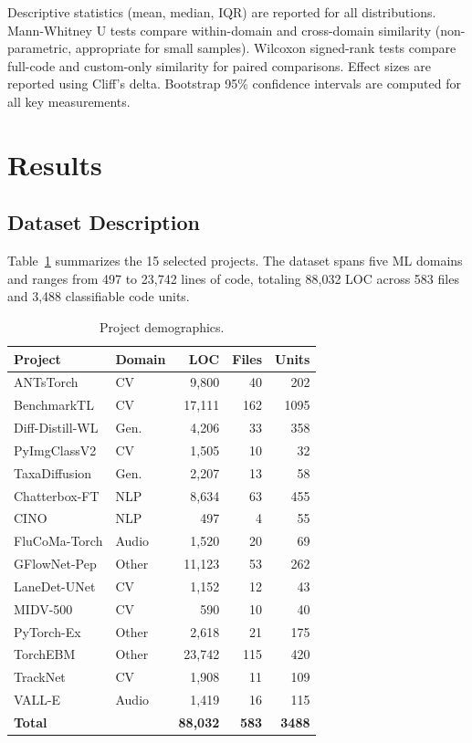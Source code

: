 \documentclass[smallextended,natbib]{svjour3}
\begin{document}
Descriptive statistics (mean, median, IQR) are reported for all distributions. Mann-Whitney U tests compare within-domain and cross-domain similarity (non-parametric, appropriate for small samples). Wilcoxon signed-rank tests compare full-code and custom-only similarity for paired comparisons. Effect sizes are reported using Cliff's delta. Bootstrap 95\% confidence intervals are computed for all key measurements.


\section{Results}
\label{sec:results}

\subsection{Dataset Description}

Table~\ref{tab:demographics} summarizes the 15 selected projects. The dataset spans five ML domains and ranges from 497 to 23,742 lines of code, totaling 88,032 LOC across 583 files and 3,488 classifiable code units.

\begin{table}[t]
\centering
\caption{Project demographics.}
\label{tab:demographics}
\small
\begin{tabular}{llrrr}
\toprule
Project & Domain & LOC & Files & Units \\
\midrule
ANTsTorch & CV & 9,800 & 40 & 202 \\
BenchmarkTL & CV & 17,111 & 162 & 1095 \\
Diff-Distill-WL & Gen. & 4,206 & 33 & 358 \\
PyImgClassV2 & CV & 1,505 & 10 & 32 \\
TaxaDiffusion & Gen. & 2,207 & 13 & 58 \\
Chatterbox-FT & NLP & 8,634 & 63 & 455 \\
CINO & NLP & 497 & 4 & 55 \\
FluCoMa-Torch & Audio & 1,520 & 20 & 69 \\
GFlowNet-Pep & Other & 11,123 & 53 & 262 \\
LaneDet-UNet & CV & 1,152 & 12 & 43 \\
MIDV-500 & CV & 590 & 10 & 40 \\
PyTorch-Ex & Other & 2,618 & 21 & 175 \\
TorchEBM & Other & 23,742 & 115 & 420 \\
TrackNet & CV & 1,908 & 11 & 109 \\
VALL-E & Audio & 1,419 & 16 & 115 \\
\midrule
\textbf{Total} & & \textbf{88,032} & \textbf{583} & \textbf{3488} \\
\bottomrule
\end{tabular}
\end{table}
\end{document}
